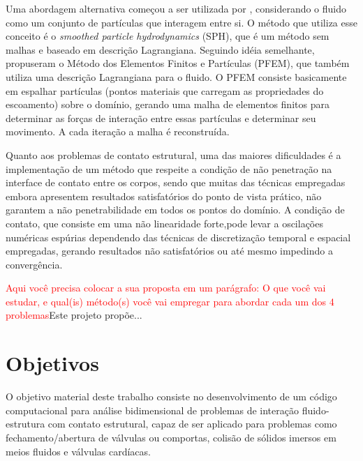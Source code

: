 \documentclass[_ArquivoPrincipal.tex]{subfiles}
\begin{document}
    Uma abordagem alternativa começou a ser utilizada por , considerando o fluido como um conjunto de partículas que interagem entre si. O método que utiliza esse conceito é o \textit{smoothed particle hydrodynamics} (SPH), que é um método sem malhas e baseado em descrição Lagrangiana. Seguindo idéia semelhante, \cite{Idelsohn2003} propuseram o Método dos Elementos Finitos e Partículas (PFEM), que também utiliza uma descrição Lagrangiana para o fluido. O PFEM consiste basicamente em espalhar partículas (pontos materiais que carregam as propriedades do escoamento) sobre o domínio, gerando uma malha de elementos finitos para determinar as forças de interação entre essas partículas e determinar seu movimento. A cada iteração a malha é reconstruída.

    Quanto aos problemas de contato estrutural, uma das maiores dificuldades é a implementação de um método que respeite a condição de não penetração na interface de contato entre os corpos, sendo que muitas das técnicas empregadas embora apresentem resultados satisfatórios do ponto de vista prático, não garantem a não penetrabilidade em todos os pontos do domínio. A condição de contato, que consiste em uma não linearidade forte,pode levar a oscilações numéricas espúrias dependendo das técnicas de discretização temporal e espacial empregadas, gerando resultados não satisfatórios ou até mesmo impedindo a convergência. 
    
    \textcolor{red}{Aqui você precisa colocar a sua proposta em um parágrafo: O que você vai estudar, e qual(is) método(s) você vai empregar para abordar cada um dos 4 problemas}Este projeto propõe...









\section{Objetivos}

    O objetivo material deste trabalho consiste no desenvolvimento de um código computacional para análise bidimensional de problemas de interação fluido-estrutura com contato estrutural, capaz de ser aplicado para problemas como fechamento/abertura de válvulas ou comportas, colisão de sólidos imersos em meios fluidos e válvulas cardíacas. 
    
\end{document}
